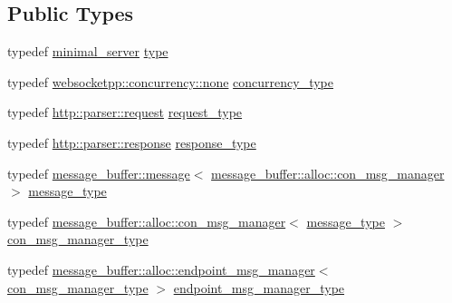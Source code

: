 \subsection*{Public Types}
\begin{DoxyCompactItemize}
\item 
typedef \hyperlink{structwebsocketpp_1_1config_1_1minimal__server}{minimal\+\_\+server} \hyperlink{structwebsocketpp_1_1config_1_1minimal__server_a2b417043c646c203ae97af495f5bc3b4}{type}
\item 
typedef \hyperlink{classwebsocketpp_1_1concurrency_1_1none}{websocketpp\+::concurrency\+::none} \hyperlink{structwebsocketpp_1_1config_1_1minimal__server_a54e2bde35814bd82607f618aacd3ec88}{concurrency\+\_\+type}
\item 
typedef \hyperlink{classwebsocketpp_1_1http_1_1parser_1_1request}{http\+::parser\+::request} \hyperlink{structwebsocketpp_1_1config_1_1minimal__server_a7b07ee40c2b25c39fb8e333f969df8e3}{request\+\_\+type}
\item 
typedef \hyperlink{classwebsocketpp_1_1http_1_1parser_1_1response}{http\+::parser\+::response} \hyperlink{structwebsocketpp_1_1config_1_1minimal__server_a19b0c06176d183a59e47bfe065b132ff}{response\+\_\+type}
\item 
typedef \hyperlink{classwebsocketpp_1_1message__buffer_1_1message}{message\+\_\+buffer\+::message}$<$ \hyperlink{classwebsocketpp_1_1message__buffer_1_1alloc_1_1con__msg__manager}{message\+\_\+buffer\+::alloc\+::con\+\_\+msg\+\_\+manager} $>$ \hyperlink{structwebsocketpp_1_1config_1_1minimal__server_aecd1340269c1429fe37f042ec4b3cfac}{message\+\_\+type}
\item 
typedef \hyperlink{classwebsocketpp_1_1message__buffer_1_1alloc_1_1con__msg__manager}{message\+\_\+buffer\+::alloc\+::con\+\_\+msg\+\_\+manager}$<$ \hyperlink{structwebsocketpp_1_1config_1_1minimal__server_aecd1340269c1429fe37f042ec4b3cfac}{message\+\_\+type} $>$ \hyperlink{structwebsocketpp_1_1config_1_1minimal__server_a005ebd181cca0e5adb553146733870b5}{con\+\_\+msg\+\_\+manager\+\_\+type}
\item 
typedef \hyperlink{classwebsocketpp_1_1message__buffer_1_1alloc_1_1endpoint__msg__manager}{message\+\_\+buffer\+::alloc\+::endpoint\+\_\+msg\+\_\+manager}$<$ \hyperlink{structwebsocketpp_1_1config_1_1minimal__server_a005ebd181cca0e5adb553146733870b5}{con\+\_\+msg\+\_\+manager\+\_\+type} $>$ \hyperlink{structwebsocketpp_1_1config_1_1minimal__server_aeb6079297c7d7ceb1742178e00d11b34}{endpoint\+\_\+msg\+\_\+manager\+\_\+type}
\item 

\end{DoxyCompactItemize}
